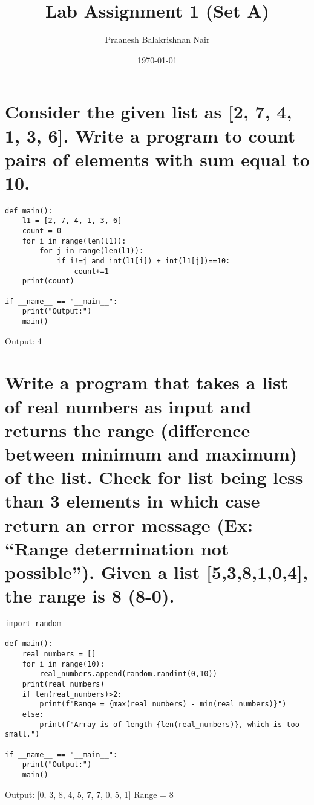 \documentclass[11pt]{article}
\author{Praanesh Balakrishnan Nair}
\date{\today}
\title{Lab Assignment 1 (Set A)}
\begin{document}
\maketitle
\tableofcontents

\section{Consider the given list as [2, 7, 4, 1, 3, 6]. Write a program to count pairs of elements with sum equal to 10.}
\label{sec:orgddb6239}
\begin{verbatim}
def main():
    l1 = [2, 7, 4, 1, 3, 6]
    count = 0
    for i in range(len(l1)):
        for j in range(len(l1)):
            if i!=j and int(l1[i]) + int(l1[j])==10:
                count+=1
    print(count)

if __name__ == "__main__":
    print("Output:")
    main()

\end{verbatim}
Output:
4
\section{Write a program that takes a list of real numbers as input and returns the range (difference between minimum and maximum) of the list. Check for list being less than 3 elements in which case return an error message (Ex: “Range determination not possible”). Given a list [5,3,8,1,0,4], the range is 8 (8-0).}
\label{sec:orgdccfab7}
\begin{verbatim}
import random

def main():
    real_numbers = []
    for i in range(10):
        real_numbers.append(random.randint(0,10))
    print(real_numbers)
    if len(real_numbers)>2:
        print(f"Range = {max(real_numbers) - min(real_numbers)}")
    else:
        print(f"Array is of length {len(real_numbers)}, which is too small.")

if __name__ == "__main__":
    print("Output:")
    main()
\end{verbatim}
Output:
{[}0, 3, 8, 4, 5, 7, 7, 0, 5, 1]
Range = 8
\end{document}
